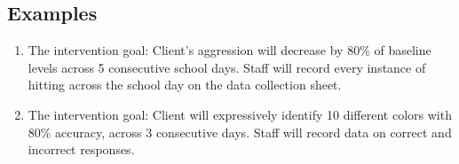 \subsection{Examples}
\begin{enumerate}
\item The intervention goal: Client's aggression will decrease by 80\% of baseline levels across 5 consecutive school days. Staff will record every instance of hitting across the school day on the data collection sheet. 
\item The intervention goal: Client will expressively identify 10 different colors with 80\% accuracy, across 3 consecutive days. Staff will record data on correct and incorrect responses.
\end{enumerate}
%
